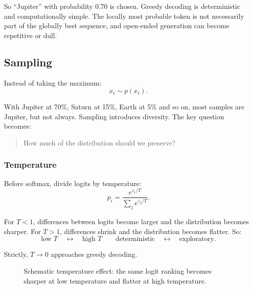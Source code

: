 So ``Jupiter'' with probability $0.70$ is chosen.
Greedy decoding is deterministic and computationally simple.
The locally most probable token is not necessarily part of the globally best sequence, and open-ended generation can become repetitive or dull.

\subsection{Sampling}
\label{subsec:modern-sampling}
Instead of taking the maximum:
\[
x_t\sim p(x_t).
\]

With Jupiter at 70\%, Saturn at 15\%, Earth at 5\% and so on, most samples are Jupiter, but not always.
Sampling introduces diversity.
The key question becomes:

\begin{quote}
How much of the distribution should we preserve?
\end{quote}

\subsubsection{Temperature}
\label{subsec:modern-temperature}
Before softmax, divide logits by temperature:
\[
p_i
=
\frac{e^{z_i/T}}
{\sum_j e^{z_j/T}}.
\]

For $T<1$, differences between logits become larger and the distribution becomes sharper.
For $T>1$, differences shrink and the distribution becomes flatter.
So:
\[
\boxed{
\text{low }T
\quad\longleftrightarrow\quad
\text{high }T
\qquad
\text{deterministic}\quad\longleftrightarrow\quad\text{exploratory}
}.
\]

Strictly, $T\rightarrow0$ approaches greedy decoding.

\begin{figure}[htbp]
\centering
{}
\caption{Schematic temperature effect: the same logit ranking becomes sharper at low temperature and flatter at high temperature.}
\label{fig:modern-temperature-distributions}
\end{figure}

